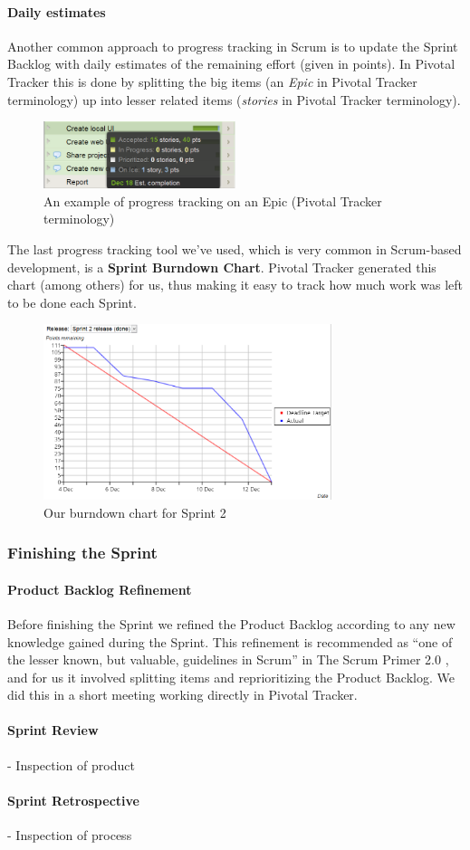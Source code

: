 \paragraph{Daily estimates}
Another common approach to progress tracking in Scrum is to update the Sprint Backlog with daily estimates of the remaining effort (given in points). In Pivotal Tracker this is done by splitting the big items (an \textit{Epic} in Pivotal Tracker terminology) up into lesser related items (\textit{stories} in Pivotal Tracker terminology).
\begin{figure}[htb]
	\centering
	\includegraphics[width=0.50\textwidth]{SCRUM/graphics/epic-example.png}
	\caption{An example of progress tracking on an Epic (Pivotal Tracker terminology)}
	\label{fig:epic-example}
\end{figure}

The last progress tracking tool we've used, which is very common in Scrum-based development, is a  \textbf{Sprint Burndown Chart}. Pivotal Tracker generated this chart (among others) for us, thus making it easy to track how much work was left to be done each Sprint.
\begin{figure}[htb]
	\centering
	\includegraphics[width=0.75\textwidth]{SCRUM/graphics/burndown-chart.png}
	\caption{Our burndown chart for Sprint 2}
	\label{fig:burndown-chart}
\end{figure}


\subsubsection{Finishing the Sprint}

\paragraph{Product Backlog Refinement}
Before finishing the Sprint we refined the Product Backlog according to any new knowledge gained during the Sprint. This refinement is recommended as ``one of the lesser known, but valuable, guidelines in Scrum'' in The Scrum Primer 2.0 \cite{ScrumPrimer2}, and for us it involved splitting items and reprioritizing the Product Backlog. We did this in a short meeting working directly in Pivotal Tracker.

\paragraph{Sprint Review}
- Inspection of product

\paragraph{Sprint Retrospective}
- Inspection of process